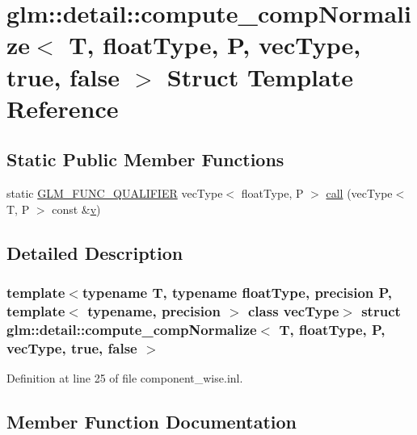 \hypertarget{structglm_1_1detail_1_1compute__comp_normalize_3_01_t_00_01float_type_00_01_p_00_01vec_type_00_01true_00_01false_01_4}{}\section{glm\+::detail\+::compute\+\_\+comp\+Normalize$<$ T, float\+Type, P, vec\+Type, true, false $>$ Struct Template Reference}
\label{structglm_1_1detail_1_1compute__comp_normalize_3_01_t_00_01float_type_00_01_p_00_01vec_type_00_01true_00_01false_01_4}
\subsection*{Static Public Member Functions}
\begin{DoxyCompactItemize}
\item 
static \mbox{\hyperlink{setup_8hpp_a33fdea6f91c5f834105f7415e2a64407}{G\+L\+M\+\_\+\+F\+U\+N\+C\+\_\+\+Q\+U\+A\+L\+I\+F\+I\+ER}} vec\+Type$<$ float\+Type, P $>$ \mbox{\hyperlink{structglm_1_1detail_1_1compute__comp_normalize_3_01_t_00_01float_type_00_01_p_00_01vec_type_00_01true_00_01false_01_4_a6a0356ee34d9a114e7123c5d4997ab97}{call}} (vec\+Type$<$ T, P $>$ const \&\mbox{\hyperlink{glad_8h_a14cfbe2fc2234f5504618905b69d1e06}{v}})
\end{DoxyCompactItemize}


\subsection{Detailed Description}
\subsubsection*{template$<$typename T, typename float\+Type, precision P, template$<$ typename, precision $>$ class vec\+Type$>$\newline
struct glm\+::detail\+::compute\+\_\+comp\+Normalize$<$ T, float\+Type, P, vec\+Type, true, false $>$}



Definition at line 25 of file component\+\_\+wise.\+inl.



\subsection{Member Function Documentation}
\mbox{\label{structglm_1_1detail_1_1compute__comp_normalize_3_01_t_00_01float_type_00_01_p_00_01vec_type_00_01true_00_01false_01_4_a6a0356ee34d9a114e7123c5d4997ab97}} 

